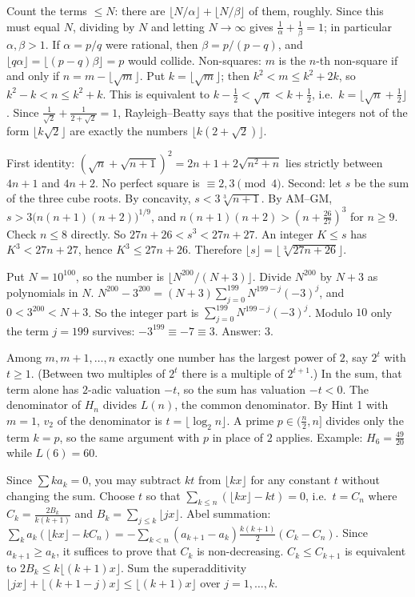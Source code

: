 \documentclass[11pt,a4paper]{article}
\begin{document}

 Count the terms $\le N$: there are $\lfloor N/\alpha\rfloor+\lfloor N/\beta\rfloor$ of them, roughly. Since this must equal $N$, dividing by $N$ and letting $N\to\infty$ gives $\frac1\alpha+\frac1\beta=1$; in particular $\alpha,\beta>1$. If $\alpha=p/q$ were rational, then $\beta=p/(p-q)$, and $\lfloor q\alpha\rfloor=\lfloor(p-q)\beta\rfloor=p$ would collide.
 Non-squares: $m$ is the $n$-th non-square if and only if $n=m-\lfloor\sqrt m\rfloor$. Put $k=\lfloor\sqrt m\rfloor$; then $k^2<m\le k^2+2k$, so $k^2-k<n\le k^2+k$. This is equivalent to $k-\frac12<\sqrt n<k+\frac12$, i.e.\ $k=\lfloor\sqrt n+\frac12\rfloor$.
 Since $\frac1{\sqrt2}+\frac1{2+\sqrt2}=1$, Rayleigh--Beatty says that the positive integers not of the form $\lfloor k\sqrt2\rfloor$ are exactly the numbers $\lfloor k(2+\sqrt2)\rfloor$.

 First identity: $(\sqrt n+\sqrt{n+1})^2=2n+1+2\sqrt{n^2+n}$ lies strictly between $4n+1$ and $4n+2$. No perfect square is $\equiv2,3\pmod4$.
 Second: let $s$ be the sum of the three cube roots. By concavity, $s<3\sqrt[3]{n+1}$. By AM--GM, $s>3\bigl(n(n+1)(n+2)\bigr)^{1/9}$, and $n(n+1)(n+2)>(n+\frac{26}{27})^3$ for $n\ge9$. Check $n\le8$ directly.
 So $27n+26<s^3<27n+27$. An integer $K\le s$ has $K^3<27n+27$, hence $K^3\le27n+26$. Therefore $\lfloor s\rfloor=\lfloor\sqrt[3]{27n+26}\rfloor$.

 Put $N=10^{100}$, so the number is $\lfloor N^{200}/(N+3)\rfloor$. Divide $N^{200}$ by $N+3$ as polynomials in $N$.
 $N^{200}-3^{200}=(N+3)\sum_{j=0}^{199}N^{199-j}(-3)^j$, and $0<3^{200}<N+3$. So the integer part is $\sum_{j=0}^{199}N^{199-j}(-3)^j$.
 Modulo $10$ only the term $j=199$ survives: $-3^{199}\equiv-7\equiv3$. Answer: $3$.

 Among $m,m+1,\dots,n$ exactly one number has the largest power of $2$, say $2^t$ with $t\ge1$. (Between two multiples of $2^t$ there is a multiple of $2^{t+1}$.) In the sum, that term alone has $2$-adic valuation $-t$, so the sum has valuation $-t<0$.
 The denominator of $H_n$ divides $L(n)$, the common denominator. By Hint 1 with $m=1$, $v_2$ of the denominator is $t=\lfloor\log_2n\rfloor$. A prime $p\in(\frac n2,n]$ divides only the term $k=p$, so the same argument with $p$ in place of $2$ applies.
 Example: $H_6=\frac{49}{20}$ while $L(6)=60$.

 Since $\sum ka_k=0$, you may subtract $kt$ from $\lfloor kx\rfloor$ for any constant $t$ without changing the sum. Choose $t$ so that $\sum_{k\le n}(\lfloor kx\rfloor-kt)=0$, i.e.\ $t=C_n$ where $C_k=\frac{2B_k}{k(k+1)}$ and $B_k=\sum_{j\le k}\lfloor jx\rfloor$.
 Abel summation: $\sum_ka_k(\lfloor kx\rfloor-kC_n)=-\sum_{k<n}(a_{k+1}-a_k)\frac{k(k+1)}2(C_k-C_n)$. Since $a_{k+1}\ge a_k$, it suffices to prove that $C_k$ is non-decreasing.
 $C_k\le C_{k+1}$ is equivalent to $2B_k\le k\lfloor(k+1)x\rfloor$. Sum the superadditivity $\lfloor jx\rfloor+\lfloor(k+1-j)x\rfloor\le\lfloor(k+1)x\rfloor$ over $j=1,\dots,k$.
\end{document}
